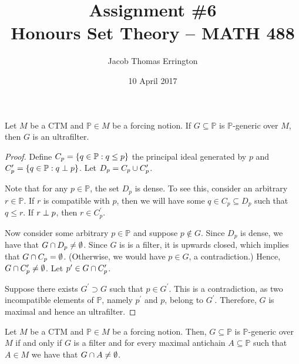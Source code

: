\documentclass[11pt]{article}
\author{Jacob Thomas Errington}
\title{Assignment \#6\\Honours Set Theory -- MATH 488}
\date{10 April 2017}
\renewcommand{\P}{\mathbb{P}}
\begin{document}
\maketitle

\begin{prop}
    Let $M$ be a CTM and $\P \in M$ be a forcing notion.
    If $G \subseteq \P$ is $\P$-generic over $M$, then $G$ is
    an ultrafilter.
\end{prop}

\begin{proof}
    Define $C_p = \setof{ q \in \P : q \leq p }$ the principal ideal generated
    by $p$
    and $C^\prime_p = \setof{ q \in \P : q \incompatible p }$.
    Let $D_p = C_p \cup C^\prime_p$.

    Note that for any $p \in \P$, the set $D_p$ is dense.
    To see this, consider an arbitrary $r \in \P$.
    If $r$ is compatible with $p$, then we will have some
    $q \in C_p \subseteq D_p$ such that $q \leq r$.
    If $r \perp p$, then $r \in C^\prime_p$.

    Now consider some arbitrary $p \in \P$ and suppose $p \notin G$.
    Since $D_p$ is dense, we have that $G \cap D_p \neq \emptyset$.
    Since $G$ is is a filter, it is upwards closed, which implies that
    $G \cap C_p = \emptyset$. (Otherwise, we would have $p \in G$, a
    contradiction.)
    Hence, $G \cap C^\prime_p \neq \emptyset$.
    Let $p^\prime \in G \cap C^\prime_p$.

    Suppose there exists $G^\prime \supset G$ such that $p \in G^\prime$.
    This is a contradiction, as two incompatible elements of $\P$, namely
    $p^\prime$ and $p$, belong to $G^\prime$.
    Therefore, $G$ is maximal and hence an ultrafilter.
\end{proof}

\begin{prop}
    Let $M$ be a CTM and $\P \in M$ be a forcing notion.
    Then,
    $G \subseteq \P$ is $\P$-generic over $M$ if and only if $G$ is a filter
    and for every maximal antichain $A \subseteq \P$ such that $A \in M$ we
    have that $G \cap A \neq \emptyset$.
\end{prop}
\end{document}

